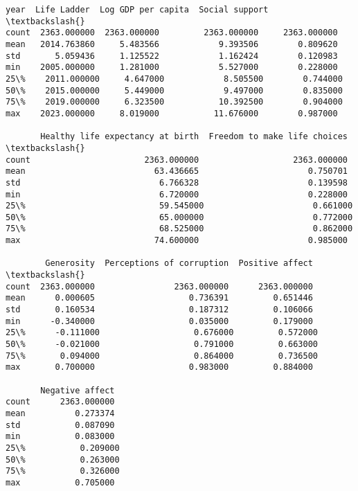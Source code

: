 \documentclass[11pt]{article}
\makeatletter
\newcommand{\boxspacing}{\kern\kvtcb@left@rule\kern\kvtcb@boxsep}
\newcommand{\prompt}[4]{
        {\ttfamily\llap{{\color{#2}[#3]:\hspace{3pt}#4}}\vspace{-\baselineskip}}
    }
\makeatother
\begin{document}
            \begin{tcolorbox}[breakable, size=fbox, boxrule=.5pt, pad at break*=1mm, opacityfill=0]
\prompt{Out}{outcolor}{24}{\boxspacing}
\begin{Verbatim}[commandchars=\\\{\}]
              year  Life Ladder  Log GDP per capita  Social support  \textbackslash{}
count  2363.000000  2363.000000         2363.000000     2363.000000
mean   2014.763860     5.483566            9.393506        0.809620
std       5.059436     1.125522            1.162424        0.120983
min    2005.000000     1.281000            5.527000        0.228000
25\%    2011.000000     4.647000            8.505500        0.744000
50\%    2015.000000     5.449000            9.497000        0.835000
75\%    2019.000000     6.323500           10.392500        0.904000
max    2023.000000     8.019000           11.676000        0.987000

       Healthy life expectancy at birth  Freedom to make life choices  \textbackslash{}
count                       2363.000000                   2363.000000
mean                          63.436665                      0.750701
std                            6.766328                      0.139598
min                            6.720000                      0.228000
25\%                           59.545000                      0.661000
50\%                           65.000000                      0.772000
75\%                           68.525000                      0.862000
max                           74.600000                      0.985000

        Generosity  Perceptions of corruption  Positive affect  \textbackslash{}
count  2363.000000                2363.000000      2363.000000
mean      0.000605                   0.736391         0.651446
std       0.160534                   0.187312         0.106066
min      -0.340000                   0.035000         0.179000
25\%      -0.111000                   0.676000         0.572000
50\%      -0.021000                   0.791000         0.663000
75\%       0.094000                   0.864000         0.736500
max       0.700000                   0.983000         0.884000

       Negative affect
count      2363.000000
mean          0.273374
std           0.087090
min           0.083000
25\%           0.209000
50\%           0.263000
75\%           0.326000
max           0.705000
\end{Verbatim}
\end{tcolorbox}
        
\end{document}
